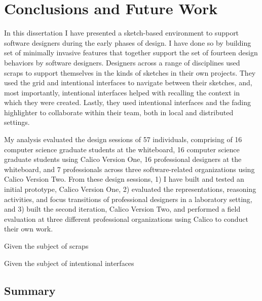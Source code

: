 \chapter{Conclusions and Future Work}
\label{chapter:conclusions}


In this dissertation I have presented a sketch-based environment to support software designers during the early phases of design. I have done so by building set of minimally invasive features that together support the set of fourteen design behaviors by software designers. Designers across a range of disciplines used scraps to support themselves in the kinds of sketches in their own projects. They used the grid and intentional interfaces to navigate between their sketches, and, most importantly, intentional interfaces helped with recalling the context in which they were created. Lastly, they used intentional interfaces and the fading highlighter to collaborate within their team, both in local and distributed settings.

My analysis evaluated the design sessions of 57 individuals, comprising of 16 computer science graduate students at the whiteboard, 16 computer science graduate students using Calico Version One, 16 professional designers at the whiteboard, and 7 professionals across three software-related organizations using Calico Version Two. From these design sessions, 1) I have built and tested an initial prototype, Calico Version One, 2) evaluated the representations, reasoning activities, and focus transitions of professional designers in a laboratory setting, and 3) built the second iteration, Calico Version Two, and performed a field evaluation at three different professional organizations using Calico to conduct their own work.

Given the subject of scraps

Given the subject of intentional interfaces

\section{Summary}

